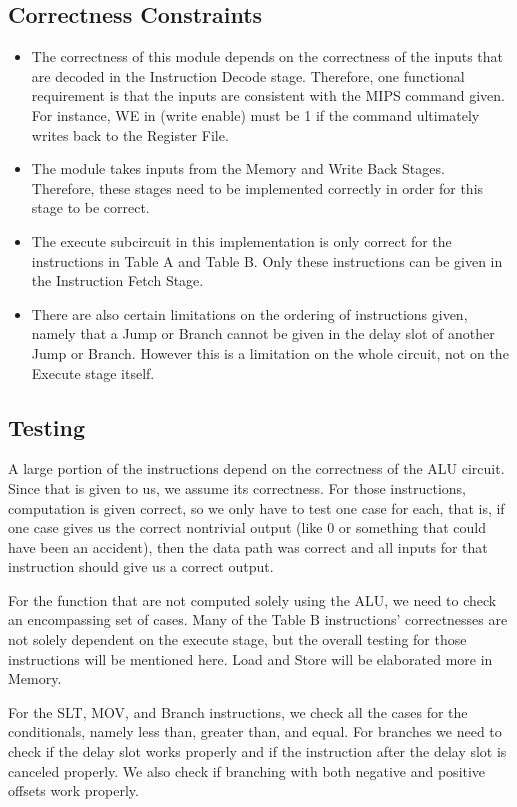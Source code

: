 \documentclass{article}
\begin{document}
\subsection{Correctness Constraints}
\begin{itemize}
\item The correctness of this module depends on the correctness of the inputs that are decoded in the Instruction Decode stage. Therefore, one functional requirement is that the inputs are consistent with the MIPS command given. For instance, WE in (write enable) must be 1 if the command ultimately writes back to the Register File. 
\item The module takes inputs from the Memory and Write Back Stages. Therefore, these stages need to be implemented correctly in order for this stage to be correct.
\item The execute subcircuit in this implementation is only correct for the instructions in Table A and Table B. Only these instructions can be given in the Instruction Fetch Stage.
\item There are also certain limitations on the ordering of instructions given, namely that a Jump or Branch cannot be given in the delay slot of another Jump or Branch. However this is a limitation on the whole circuit, not on the Execute stage itself.

\end{itemize}

\subsection{Testing}
A large portion of the instructions depend on the correctness of the ALU circuit. Since that is given to us, we assume its correctness. For those instructions, computation is given correct, so we only have to test one case for each, that is, if one case gives us the correct nontrivial output (like 0 or something that could have been an accident), then the data path was correct and all inputs for that instruction should give us a correct output. 

For the function that are not computed solely using the ALU, we need to check an encompassing set of cases. Many of the Table B instructions' correctnesses are not solely dependent on the execute stage, but the overall testing for those instructions will be mentioned here. Load and Store will be elaborated more in Memory.

For the SLT, MOV, and Branch instructions, we check all the cases for the conditionals, namely less than, greater than, and equal. For branches we need to check if the delay slot works properly and if the instruction after the delay slot is canceled properly. We also check if branching with both negative and positive offsets work properly.
\end{document}
